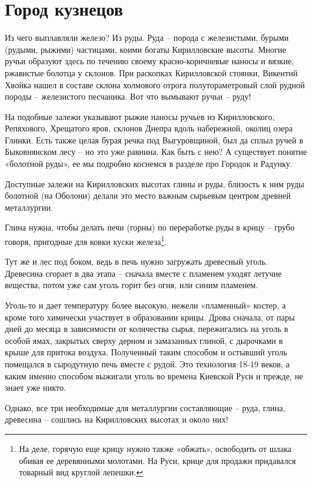 \chapter{Город кузнецов}

Из чего выплавляли железо? Из руды. Руда – порода с железистыми, бурыми (рудыми, рыжими) частицами, коими богаты Кирилловские высоты. Многие ручьи образуют здесь по течению своему красно-коричневые наносы и вязкие, ржавистые болотца у склонов. При раскопках Кирилловской стоянки, Викентий Хвойка нашел в составе склона холмового отрога полутораметровый слой рудной породы – железистого песчаника. Вот что вымывают ручьи – руду!

На подобные залежи указывают рыжие наносы ручьев из Кирилловского, Репяхового, Хрещатого яров, склонов Днепра вдоль набережной, околиц озера Глинки. Есть также целая бурая речка под Выгуровщиной, был да сплыл ручей в Быковнянском лесу – но это уже равнина. Как быть с нею? А существует понятие «болотной руды», ее мы подробно коснемся в разделе про Городок и Радунку.

Доступные залежи на Кирилловских высотах глины и руды, близость к ним руды болотной (на Оболони) делали это место важным сырьевым центром древней металлургии.

Глина нужна, чтобы делать печи (горны) по переработке руды в крицу – грубо говоря, пригодные для ковки куски железа\footnote{На деле, горячую еще крицу нужно также «обжать», освободить от шлака обивая ее деревянными молотами. На Руси, крице для продажи придавался товарный вид круглой лепешки.}.

Тут же и лес под боком, ведь в печь нужно загружать древесный уголь. Древесина сгорает в два этапа – сначала вместе с пламенем уходят летучие вещества, потом уже сам уголь горит без огня, или синим пламенем. 

Уголь-то и дает температуру более высокую, нежели «пламенный» костер, а кроме того химически участвует в образовании крицы. Дрова сначала, от пары дней до месяца в зависимости от количества сырья, пережигались на уголь в особой ямах, закрытых сверху дерном и замазанных глиной, с дырочками в крыше для притока воздуха. Полученный таким способом и остывший уголь помещался в сыродутную печь вместе с рудой. Это технология 18-19 веков, а каким именно способом выжигали уголь во времена Киевской Руси и прежде, не знает уже никто.

Однако, все три необходимые для металлургии составляющие – руда, глина, древесина – сошлись на Кирилловских высотах и около них!

